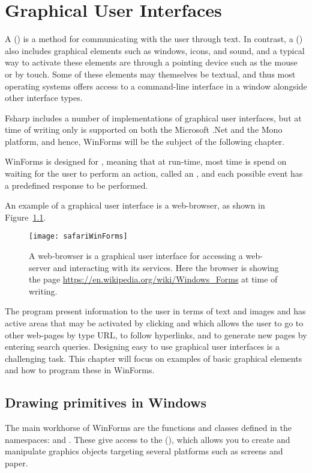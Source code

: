 \chapter{Graphical User Interfaces}
\label{chap:windows}

A  () is a method for communicating with the user through text. In contrast, a  () also includes graphical elements such as  windows, icons, and sound, and a typical way to activate these elements are through a pointing device such as the mouse or by touch. Some of these elements may themselves be textual, and thus most operating systems offers access to a command-line interface in a window alongside other interface types.

Fsharp includes a number of implementations of graphical user interfaces, but at time of writing only  is supported on both the Microsoft .Net and the Mono platform, and hence, WinForms will be the subject of the following chapter.

WinForms is designed for , meaning that at run-time, most time is spend on waiting for the user to perform an action, called an , and each possible event has a predefined response to be performed. 

An example of a graphical user interface is a web-browser, as shown in Figure~\ref{fig:safariGui}.
\begin{figure}
  \centering
  \texttt{[image: safariWinForms]}
  \caption{A web-browser is a graphical user interface for accessing a web-server and interacting with its services. Here the browser is showing the page \url{https://en.wikipedia.org/wiki/Windows_Forms} at time of writing.}
  \label{fig:safariGui}
\end{figure}
The program present information to the user in terms of text and images and has active areas that may be activated by clicking and which allows the user to go to other web-pages by type URL, to follow hyperlinks, and to generate new pages by entering search queries. Designing easy to use graphical user interfaces is a challenging task. This chapter will focus on examples of basic graphical elements and how to program these in WinForms.

\section{Drawing primitives in Windows}
The main workhorse of WinForms are the functions and classes defined in the namespaces:   and . These give access to the  (), which allows you to create and manipulate graphics objects targeting several platforms such as screens and paper. 

